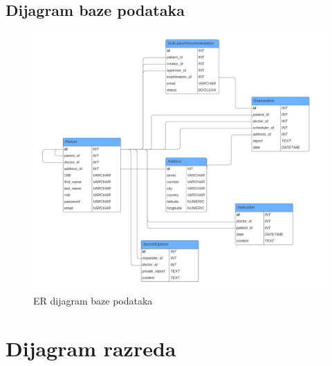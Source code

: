 		\subsection{Dijagram baze podataka}
		    \begin{figure}[H]
			     \includegraphics[width=\textwidth]{slike/DijagramBazePodataka.png} 
			     \caption{ER dijagram baze podataka} 
		    \end{figure}
		\eject
		
			
		\section{Dijagram razreda}
		
			
			
			
